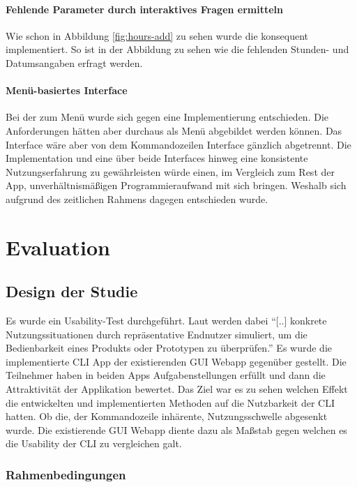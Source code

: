 \documentclass[oneside,bibliography=totocnumbered,BCOR=5mm]{scrbook}
\begin{document}
\subsubsection{Fehlende Parameter durch interaktives Fragen ermitteln}

Wie schon in Abbildung \ref{fig:hours-add} zu sehen wurde die
 konsequent implementiert. So ist in der
Abbildung zu sehen wie die fehlenden Stunden- und Datumsangaben erfragt werden.

\subsubsection{Menü-basiertes Interface}

Bei der  zum Menü wurde sich gegen eine Implementierung
entschieden. Die Anforderungen hätten aber durchaus als Menü abgebildet werden
können. Das Interface wäre aber von dem Kommandozeilen Interface gänzlich
abgetrennt. Die Implementation und eine über beide Interfaces hinweg eine
konsistente Nutzungserfahrung zu gewährleisten würde einen, im Vergleich zum
Rest der App, unverhältnismäßigen Programmieraufwand mit sich bringen. Weshalb
sich aufgrund des zeitlichen Rahmens dagegen entschieden wurde.

\chapter{Evaluation}
\section{Design der Studie}

Es wurde ein Usability-Test durchgeführt. Laut \cite[36]{henger2003} werden
dabei ``[..] konkrete Nutzungssituationen durch repräsentative Endnutzer
simuliert, um die Bedienbarkeit eines Produkts oder Prototypen zu überprüfen.''
Es wurde die implementierte CLI App der existierenden GUI Webapp gegenüber
gestellt. Die Teilnehmer haben in beiden Apps Aufgabenstellungen erfüllt und
dann die Attraktivität der Applikation bewertet. Das Ziel war es zu sehen
welchen Effekt die entwickelten und implementierten Methoden auf die Nutzbarkeit
der CLI hatten. Ob die, der Kommandozeile inhärente, Nutzungsschwelle abgesenkt
wurde. Die existierende GUI Webapp diente dazu als Maßstab gegen welchen es die
Usability der CLI zu vergleichen galt.

\subsection{Rahmenbedingungen}
\end{document}

